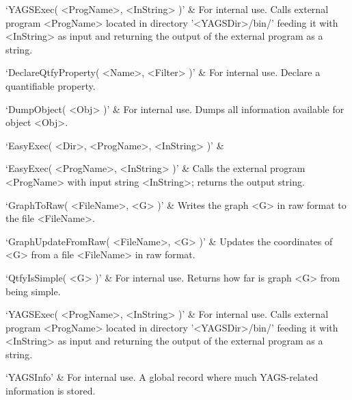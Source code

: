 `YAGSExec( <ProgName>, <InString> )' & 
For  internal  use.  Calls  external  program  <ProgName> located in directory
'<YAGSDir>/bin/'  feeding  it with <InString> as input and returning  the
output  of  the  external  program  as a string.
\enditems


\beginitems
`DeclareQtfyProperty( <Name>, <Filter> )' & 
For internal use. Declare a quantifiable property.

`DumpObject( <Obj> )' & 
For internal use. Dumps  all information available for object <Obj>.

`EasyExec( <Dir>, <ProgName>, <InString> )' & 

`EasyExec( <ProgName>, <InString> )' & 
Calls the external program <ProgName> with input string <InString>; returns the output string.

`GraphToRaw( <FileName>, <G> )' & 
Writes the graph <G> in raw format to the file  <FileName>.

`GraphUpdateFromRaw( <FileName>, <G> )' & 
Updates  the  coordinates  of  <G>  from  a file <FileName> in raw format.

`QtfyIsSimple( <G> )' & 
For internal use. Returns how far is graph <G> from being simple.

`YAGSExec( <ProgName>, <InString> )' & 
For  internal  use.  Calls  external  program  <ProgName> located in directory
'<YAGSDir>/bin/'  feeding  it with <InString> as input and returning  the
output  of  the  external  program  as a string.

`YAGSInfo' &
For internal use. A global record where much YAGS-related information is stored.
\enditems

%
%
%
%


